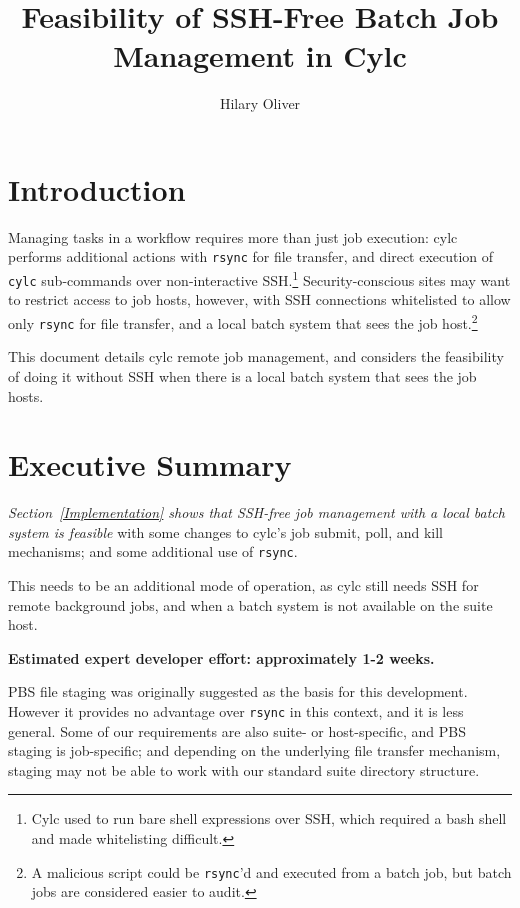 \documentclass{article}
\title{Feasibility of SSH-Free Batch Job Management in Cylc}
\author{Hilary Oliver}
\begin{document}
\maketitle

\section{Introduction}

Managing tasks in a workflow requires more than just job execution: cylc
performs additional actions with \lstinline=rsync= for file transfer, and
direct execution of \lstinline=cylc= sub-commands over non-interactive
SSH.\footnote{Cylc used to run bare shell expressions over SSH, which required
a bash shell and made whitelisting difficult.}
Security-conscious sites may want to restrict access to job hosts, however,
with SSH connections whitelisted to allow only \lstinline=rsync= for file
transfer, and a local batch system that sees the job host.\footnote{A malicious
script could be \lstinline=rsync='d and executed from a batch job, but batch
jobs are considered easier to audit.}

This document details cylc remote job management, and considers the feasibility
of doing it without SSH when there is a local batch system that sees the job
hosts.

\section{Executive Summary}

{\em Section~\ref{Implementation} shows that SSH-free job management with a
local batch system is feasible} with some changes to cylc's job submit, poll,
and kill mechanisms; and some additional use of \lstinline=rsync=.

This needs to be an additional mode of operation, as cylc still needs
SSH for remote background jobs, and when a batch system is not available on
the suite host.

{\bf Estimated expert developer effort: approximately 1-2 weeks.}

PBS file staging was originally suggested as the basis for this development.
However it provides no advantage over \lstinline=rsync= in this context, and it
is less general. Some of our requirements are also suite- or host-specific, and
PBS staging is job-specific; and depending on the underlying file transfer
mechanism, staging may not be able to work with our standard suite directory
structure.
\end{document}
